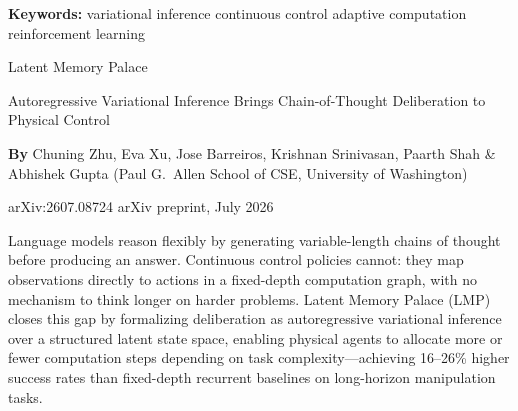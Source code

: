 \documentclass[10pt,twocolumn]{article}
\begin{document}
\setlength{\parindent}{0pt}
\setlength{\parskip}{4pt}

{\small\color{keywordgray}\textbf{Keywords:}
  variational inference \textbullet{}
  continuous control \textbullet{}
  adaptive computation \textbullet{}
  reinforcement learning}\par\vspace{4pt}

{\LARGE\bfseries\raggedright
  Latent Memory Palace}\par\vspace{4pt}

{\large\itshape\raggedright
  Autoregressive Variational Inference Brings
  Chain-of-Thought Deliberation to Physical Control}\par\vspace{6pt}

{\small\textbf{By} Chuning Zhu, Eva Xu, Jose Barreiros,
  Krishnan Srinivasan, Paarth Shah \& Abhishek Gupta
  (Paul G.\ Allen School of CSE, University of Washington)}\par\vspace{2pt}

{\small\color{keywordgray}arXiv:2607.08724 \textbullet{}
  arXiv preprint, July 2026}
\par\vspace{2pt}\noindent{\color{rulered}\rule{\columnwidth}{0.6pt}}\vspace{6pt}

Language models reason flexibly by generating variable-length chains
of thought before producing an answer. Continuous control policies
cannot: they map observations directly to actions in a fixed-depth
computation graph, with no mechanism to think longer on harder problems.
Latent Memory Palace (LMP) closes this gap by formalizing deliberation
as autoregressive variational inference over a structured latent state
space, enabling physical agents to allocate more or fewer computation
steps depending on task complexity---achieving 16--26\% higher success
rates than fixed-depth recurrent baselines on long-horizon manipulation tasks.
\end{document}
